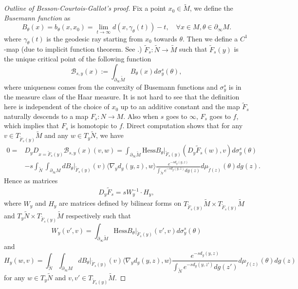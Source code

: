 \documentclass{article}
\newcommand{\cB}{\mathcal{B}}
\newcommand{\del}{\partial}
\newcommand{\hess}{\mathrm{Hess}}
\theoremstyle{definition}
\begin{document}
\begin{proof}[Outline of Besson-Courtois-Gallot's proof]
Fix a point $x_0\in\widetilde M$, we define the \emph{Busemann function} as
$$B_{\theta}(x)=b_\theta(x,x_0)=\lim_{t\to\infty}d(x,\gamma_\theta(t))-t,\quad\forall x\in M, \theta\in\del_\infty M.$$
where $\gamma_\theta(t)$ is the geodesic ray starting from $x_0$ towards $\theta$. Then we define a $C^1$-map (due to implicit function theorem. See \cite[pages 635-636]{BCG2}.) 
$\widetilde F_s:\widetilde N\to\widetilde M$ such that $\widetilde F_s(y)$ is the unique critical point of the following function
$$\cB_{s,y}(x):=\int_{\del_\infty\widetilde M}B_\theta(x)d\sigma_y^s(\theta),$$
where uniqueness comes from the convexity of Busemann functions and $\sigma_y^s$ is in the measure class of the Haar measure. It is not hard to see that the definition here is independent of the choice of $x_0$ up to an additive constant and the map $\tilde F_s$ naturally descends to a map $F_s:N\to M$. Also when $s$ goes to $\infty$, $F_s$ goes to $f$, which implies that $F_s$ is homotopic to $f$. Direct computation shows that for any $v\in T_{\widetilde F_s(y)}\widetilde M$ and any $w\in T_y\widetilde N$, we have
\begin{align*}
0=&D_yD_{x=\widetilde F_s(y)}\cB_{s,y}(x)(v,w)=\int_{\del_\infty\widetilde M}\hess B_\theta|_{\widetilde F_s(y)}(D_y\widetilde F_s(w),v)d\sigma_y^s(\theta) \\ 
&-s\int_{\widetilde N}\int_{\del_\infty M}dB_\theta|_{\widetilde F_s(y)}(v)\langle \nabla_yd_g(y,z),w\rangle  \frac{e^{-sd_g(y,z)}}{\int_{\widetilde N}e^{-sd_g(y,z)}dg(z)}d\mu_{\widetilde f(z)}(\theta)dg(z).
\end{align*}
Hence as matrices
\begin{align}\label{DF_s}
D_y\widetilde F_s=sW_y^{-1}\cdot H_y,
\end{align}
where $W_y$ and $H_y$ are matrices defined by bilinear forms on $T_{\widetilde F_s(y)}\widetilde M\times T_{\widetilde F_s(y)}\widetilde M$ and $T_y\widetilde N\times T_{\widetilde F_s(y)}\widetilde M$ respectively such that
$$W_y(v',v)=\int_{\del_\infty\widetilde M}\hess B_\theta|_{\widetilde F_s(y)}(v',v)d\sigma_y^s(\theta)$$
and 
$$H_y(w,v)=\int_{\widetilde N}\int_{\del_\infty M}dB_\theta|_{\widetilde F_s(y)}(v)\langle \nabla_yd_g(y,z),w\rangle  \frac{e^{-sd_g(y,z)}}{\int_{\widetilde N}e^{-sd_g(y,z')}dg(z')}d\mu_{\widetilde f(z)}(\theta)dg(z)$$
for any $w\in T_y\widetilde N$ and $v,v'\in T_{\widetilde F_s(y)}\widetilde M$.


\end{proof}
\end{document}
